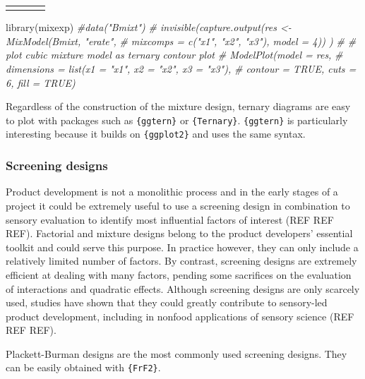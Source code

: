 \documentclass[
]{book}
\newenvironment{Shaded}{\begin{snugshade}}{\end{snugshade}}
\newcommand{\CommentTok}[1]{\textcolor[rgb]{0.56,0.35,0.01}{\textit{#1}}}
\newcommand{\FunctionTok}[1]{\textcolor[rgb]{0.00,0.00,0.00}{#1}}
\newcommand{\NormalTok}[1]{#1}
\begin{document}
\begin{table}
\begin{longtable}{|p{0.74in}|p{0.70in}|p{0.56in}|p{1.58in}}
\noalign{\global\setlength{\arrayrulewidth}{2pt}}\arrayrulecolor[HTML]{000000}\cline{1-4}

\end{longtable}

\end{table}

\begin{Shaded}
\begin{Highlighting}[]
\FunctionTok{library}\NormalTok{(mixexp)}
\CommentTok{\#data("Bmixt")}
\CommentTok{\# invisible(capture.output(res \textless{}{-} MixModel(Bmixt, "erate",}
\CommentTok{\#             mixcomps = c("x1", "x2", "x3"), model = 4)) )}
\CommentTok{\# \# plot cubic mixture model as ternary contour plot}
\CommentTok{\# ModelPlot(model = res,}
\CommentTok{\#           dimensions = list(x1 = "x1", x2 = "x2", x3 = "x3"),}
\CommentTok{\#           contour = TRUE, cuts = 6, fill = TRUE)}
\end{Highlighting}
\end{Shaded}

Regardless of the construction of the mixture design, ternary diagrams are easy to plot with packages such as \texttt{\{ggtern\}} or \texttt{\{Ternary\}}. \texttt{\{ggtern\}} is particularly interesting because it builds on \texttt{\{ggplot2\}} and uses the same syntax.

\hypertarget{screening-designs}{%
\subsubsection{Screening designs}\label{screening-designs}}

Product development is not a monolithic process and in the early stages of a project it could be extremely useful to use a screening design in combination to sensory evaluation to identify most influential factors of interest (REF REF REF). Factorial and mixture designs belong to the product developers' essential toolkit and could serve this purpose. In practice however, they can only include a relatively limited number of factors. By contrast, screening designs are extremely efficient at dealing with many factors, pending some sacrifices on the evaluation of interactions and quadratic effects.
Although screening designs are only scarcely used, studies have shown that they could greatly contribute to sensory-led product development, including in nonfood applications of sensory science (REF REF REF).

Plackett-Burman designs are the most commonly used screening designs. They can be easily obtained with \texttt{\{FrF2\}}.
\end{document}
